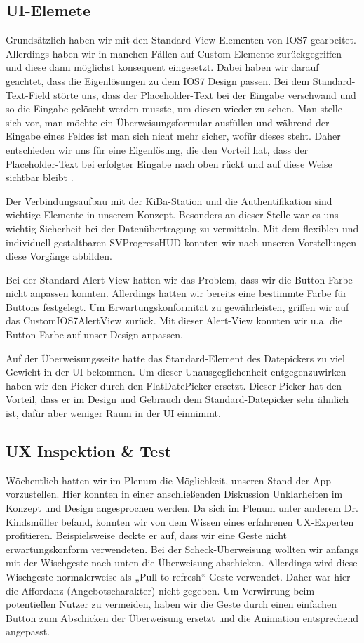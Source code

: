 \subsection{UI-Elemete}
	Grundsätzlich haben wir mit den Standard-View-Elementen von IOS7 gearbeitet. Allerdings haben wir in manchen Fällen auf Custom-Elemente zurückgegriffen und diese dann möglichst konsequent eingesetzt. Dabei haben wir darauf geachtet, dass die Eigenlösungen zu dem IOS7 Design passen. Bei dem Standard-Text-Field störte uns, dass der Placeholder-Text bei der Eingabe verschwand und so die Eingabe gelöscht werden musste, um diesen wieder zu sehen. Man stelle sich vor, man möchte ein Überweisungsformular ausfüllen und während der Eingabe eines Feldes ist man sich nicht mehr sicher, wofür dieses steht. Daher entschieden wir uns für eine Eigenlösung, die den Vorteil hat, dass der Placeholder-Text bei erfolgter Eingabe nach oben rückt und auf diese Weise sichtbar bleibt \citep{JV13}. 

 	Der Verbindungsaufbau mit der KiBa-Station und die Authentifikation sind wichtige Elemente in unserem Konzept. Besonders an dieser Stelle war es uns wichtig Sicherheit bei der Datenübertragung zu vermitteln. Mit dem flexiblen und individuell gestaltbaren SVProgressHUD \citep{SVHUD11} konnten wir nach unseren Vorstellungen diese Vorgänge abbilden.

	Bei der Standard-Alert-View hatten wir das Problem, dass wir die Button-Farbe nicht anpassen konnten. Allerdings hatten wir bereits eine bestimmte Farbe für Buttons festgelegt. Um Erwartungskonformität zu gewährleisten, griffen wir auf das CustomIOS7AlertView \citep{CustomAlertView13} zurück. Mit dieser Alert-View konnten wir u.a. die Button-Farbe auf unser Design anpassen.

	Auf der Überweisungsseite hatte das Standard-Element des Datepickers zu viel Gewicht in der UI bekommen. Um dieser Unausgeglichenheit entgegenzuwirken haben wir den Picker durch den FlatDatePicker \citep{FlatDate13} ersetzt. Dieser Picker hat den Vorteil, dass er im Design und Gebrauch dem Standard-Datepicker sehr ähnlich ist, dafür aber weniger Raum in der UI einnimmt.
 

\subsection{UX Inspektion \& Test}
	Wöchentlich hatten wir im Plenum die Möglichkeit, unseren Stand der App vorzustellen. Hier konnten in einer anschließenden Diskussion Unklarheiten im Konzept und Design angesprochen werden. Da sich im Plenum unter anderem Dr. Kindsmüller befand, konnten wir von dem Wissen eines erfahrenen UX-Experten profitieren. Beispielsweise deckte er auf, dass wir eine Geste nicht erwartungskonform verwendeten. Bei der Scheck-Überweisung wollten wir anfangs mit der Wischgeste nach unten die Überweisung abschicken. Allerdings wird diese Wischgeste normalerweise als „Pull-to-refresh“-Geste verwendet. Daher war hier die Affordanz (Angebotscharakter) nicht gegeben. Um Verwirrung beim potentiellen Nutzer zu vermeiden, haben wir die Geste durch einen einfachen Button zum Abschicken der Überweisung ersetzt und die Animation entsprechend angepasst.

